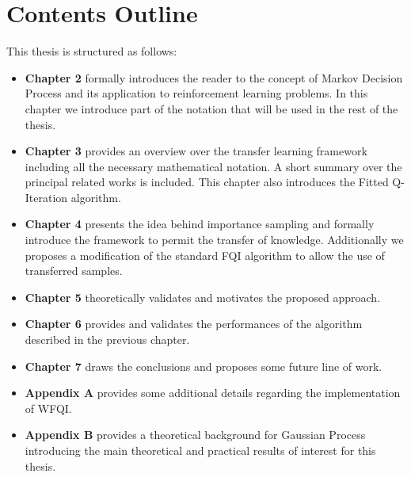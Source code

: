   \section{Contents Outline}
    \noindent This thesis is structured as follows:
    \begin{itemize}
      \item \textbf{Chapter 2} formally introduces the reader to the concept of
            Markov Decision Process and its application to reinforcement learning
            problems. In this chapter we introduce part of the notation that will
            be used in the rest of the thesis.
      \item \textbf{Chapter 3} provides an overview over the transfer learning
            framework including all the necessary mathematical notation. A short
            summary over the principal related works is included. This chapter also introduces the Fitted Q-Iteration algorithm.
      \item \textbf{Chapter 4} presents the idea behind importance sampling and formally introduce the framework
            to permit the transfer of knowledge. Additionally we proposes a modification of the standard FQI algorithm to
            allow the use of transferred samples.
      \item \textbf{Chapter 5} theoretically validates and motivates the proposed approach.
      \item \textbf{Chapter 6} provides and validates the performances of the algorithm
            described in the previous chapter.
      \item \textbf{Chapter 7} draws the conclusions and proposes some future line of work.
      \item \textbf{Appendix A} provides some additional details regarding the implementation of WFQI.
      \item \textbf{Appendix B} provides a theoretical background for Gaussian Process introducing the main
            theoretical and practical results of interest for this thesis.
    \end{itemize}

